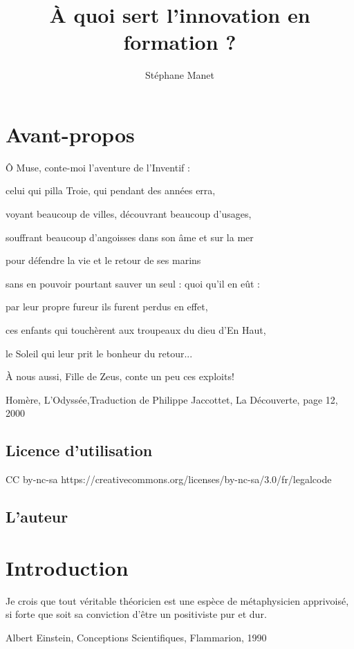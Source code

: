 \documentclass[a4paper, 11pt]{report}
\begin{document}
\title{À quoi sert l'innovation en formation ?}
\author{Stéphane Manet}
\date{} 
\maketitle

\begin{abstract}
\end{abstract}
\tableofcontents
\chapter*{Avant-propos}
\epigraph{Ô Muse, conte-moi l'aventure de l'Inventif :
	
	celui qui pilla Troie, qui pendant des années erra,
	
	voyant beaucoup de villes, découvrant beaucoup d'usages,
	
	souffrant beaucoup d'angoisses dans son âme et sur la mer
	
	pour défendre la vie et le retour de ses marins
	
	sans en pouvoir pourtant sauver un seul : quoi qu'il en eût :
	
	par leur propre fureur ils furent perdus en effet,
	
	ces enfants qui touchèrent aux troupeaux du dieu d'En Haut,
	
	le Soleil qui leur prit le bonheur du retour...
	
	À nous aussi, Fille de Zeus, conte un peu ces exploits!}{Homère, L'Odyssée,Traduction de Philippe Jaccottet, La Découverte, page 12, 2000}
\section*{Licence d'utilisation}

\lipsum
CC by-nc-sa
https://creativecommons.org/licenses/by-nc-sa/3.0/fr/legalcode
\section*{L'auteur}

\chapter{Introduction}
\epigraph{Je crois que tout véritable théoricien est une espèce de métaphysicien apprivoisé, si forte que soit sa conviction d'être un positiviste pur et dur.}{Albert Einstein, Conceptions Scientifiques, Flammarion, 1990}
\end{document}
